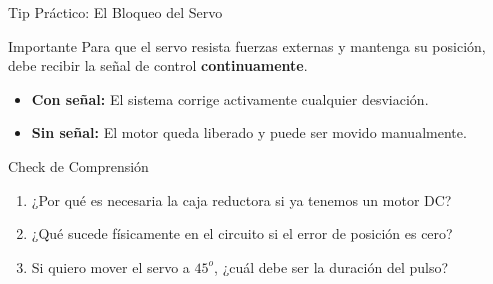 \begin{frame}{Tip Práctico: El Bloqueo del Servo}
  \begin{alertblock}{Importante}
    Para que el servo resista fuerzas externas y mantenga su posición, debe recibir la señal de control \textbf{continuamente}.
  \end{alertblock}
  \vspace{0.5cm}
  \begin{itemize}
    \item \textbf{Con señal:} El sistema corrige activamente cualquier desviación.\n    \item \textbf{Sin señal:} El motor queda liberado y puede ser movido manualmente.\n  \end{itemize}
\end{frame}

\begin{frame}{Check de Comprensión}
  \begin{enumerate}
    \item ¿Por qué es necesaria la caja reductora si ya tenemos un motor DC?\n    \item ¿Qué sucede físicamente en el circuito si el error de posición es cero?\n    \item Si quiero mover el servo a $45^o$, ¿cuál debe ser la duración del pulso?\n  \end{enumerate}
\end{frame}